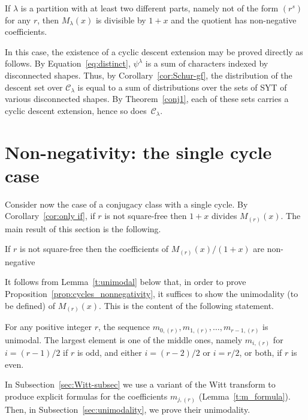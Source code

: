 \documentclass[ALCO,published]{cedram}
\newcommand{\C}{\mathcal C}
\begin{document}
\begin{corollary}
    If $\lambda$ is a partition with at least two different parts, namely not of the form $(r^s)$ for any $r$, 
    then $M_\lambda(x)$ is divisible by $1+x$ and the quotient has non-negative coefficients.
\end{corollary}

\begin{remark}\label{rem:distinct} 
    In this case, the existence of a cyclic descent extension
    may be proved directly as follows.
    By Equation~\eqref{eq:distinct}, $\psi^\lambda$ is a sum of characters indexed by disconnected shapes. 
    Thus, by 
    Corollary~\ref{cor:Schur-gf}, the distribution of the descent set over $\C_\lambda$ is equal to a sum of distributions over the sets of SYT of various disconnected shapes.
    By Theorem~\ref{conj1}, each of these sets carries a cyclic descent extension, hence so does~$\C_\lambda$.
\end{remark}


\section{Non-negativity: the single cycle case}
\label{sec:cycles}

Consider now the case of a conjugacy class with a single cycle.
By Corollary~\ref{cor:only if}, if $r$ is not square-free then $1+x$ divides $M_{(r)}(x)$. 
The main result of this section is the following. 

\begin{proposition}\label{prop:cycles_nonnegativity}
    If $r$ is not square-free then the coefficients of $M_{(r)}(x)/(1+x)$ are non-negative
\end{proposition}
		
It follows from Lemma~\ref{t:unimodal} below that, in order to prove Proposition~\ref{prop:cycles_nonnegativity}, it suffices to show the unimodality (to be defined) of $M_{(r)}(x)$. This is the content of the following statement.
		 
\begin{proposition}\label{prop:s=1_unimodal}
    For any positive integer $r$, the sequence $m_{0,(r)}, m_{1,(r)},\ldots, m_{r-1,(r)}$ is unimodal.
    The largest element is one of the middle ones, namely $m_{i,(r)}$ for $i = (r-1)/2$ if $r$ is odd, and either $i = (r-2)/2$ or $i = r/2$, or both, if $r$ is even.
\end{proposition}

In Subsection~\ref{sec:Witt-subsec} we use a variant of the Witt transform to produce explicit formulas for the coefficients $m_{j,(r)}$ (Lemma~\ref{t:m_formula}).
Then, in Subsection~\ref{sec:unimodality}, we prove their unimodality.
\end{document}
